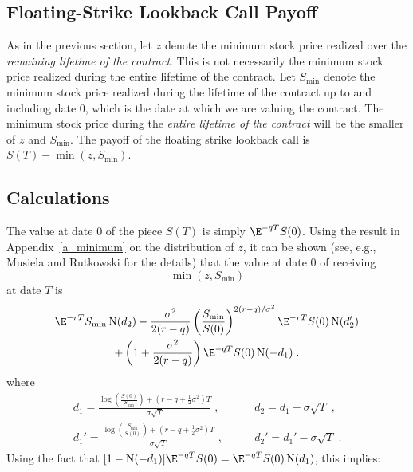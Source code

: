 \subsection*{Floating-Strike Lookback Call Payoff}

As in the previous section, let $z$ denote the minimum stock price realized over the \emph{remaining lifetime of the contract}.  This is not necessarily the minimum stock price realized during the entire lifetime of the contract.  Let $S_{\min}$ denote the minimum stock price realized during the lifetime of the contract up to and including date 0, which is the date at which we are valuing the contract.  The minimum stock price during the \emph{entire lifetime of the contract} will be the smaller of $z$ and $S_{\text{min}}$.  The payoff of the floating strike lookback call is $S(T) - \min\left(z, S_{\text{min}}\right)$.




\subsection*{Calculations}
The value at date 0 of the piece $S(T)$ is simply $\E^{-qT}S(0)$.  Using the result in Appendix~\ref{a_minimum} on the distribution of $z$, it can be shown (see, e.g., Musiela and Rutkowski \cite{MR} for the details) that the value at date 0 of receiving 
$$\min(z, S_{\text{min}})$$
at date $T$ is
\begin{multline*}
\E^{-rT}S_{\text{min}}\N(d_2) -\frac{\sigma^2}{2(r-q)}\left(\frac{S_{\text{min}}}{S(0)}\right)^{2(r-q)/\sigma^2}\E^{-rT}S(0)\N(d_2') \\
+\left(1+ \frac{\sigma^2}{2(r-q)}\right)\E^{-qT}S(0)\N(-d_1)\;.
\end{multline*}
where
\begin{subequations}\label{fslc100combined}
\begin{align}
d_1 = \frac{\log\left(\frac{S(0)}{S_{\text{min}}}\right)+\left(r-q+\frac{1}{2}\sigma^2\right)T}{\sigma\sqrt{T}}\; , &\qquad d_2 = d_1 - \sigma\sqrt{T}\;,\label{fslc100a}\\
d_1' = \frac{\log\left(\frac{S_{\text{min}}}{S(0)}\right)+\left(r-q+\frac{1}{2}\sigma^2\right)T}{\sigma\sqrt{T}}\;, &\qquad d_2'=d_1' - \sigma\sqrt{T} \;.\label{fslc100c}
\end{align}\end{subequations}
Using the fact that $[1-\N(-d_1)]\E^{-qT}S(0)=\E^{-qT}S(0)\N(d_1)$, this implies:

